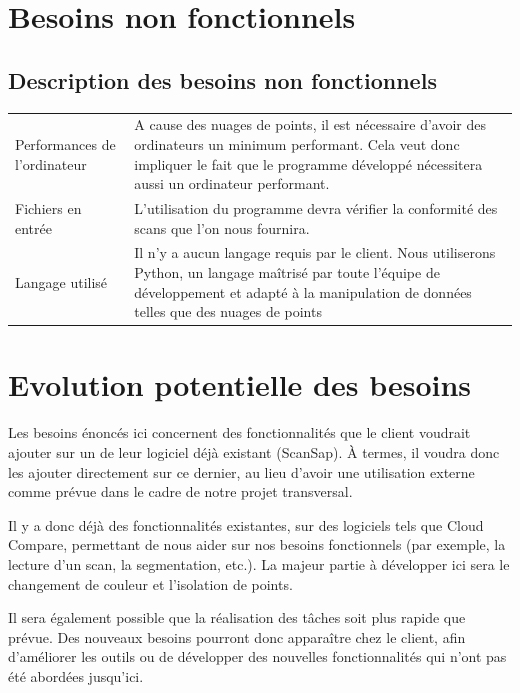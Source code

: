 \documentclass[12pt,titlepage,french]{article}
\begin{document}
\section{Besoins non fonctionnels}

\subsection*{Description des besoins non fonctionnels}

\noindent\begin{tabu} to \textwidth {X[c]X[c3]}\toprule
{}&\\\toprule
Performances de l'ordinateur
& A cause des nuages de points, il est nécessaire d'avoir des ordinateurs un minimum performant. Cela veut donc impliquer le fait que le programme développé nécessitera aussi un ordinateur performant.\\\midrule
Fichiers en entrée
& L'utilisation du programme devra vérifier la conformité des scans que l'on nous fournira.\\\midrule
Langage utilisé
& Il n'y a aucun langage requis par le client. Nous utiliserons Python, un langage maîtrisé par toute l'équipe de développement et adapté à la manipulation de données telles que des nuages de points\\\bottomrule
\end{tabu}

\section{Evolution potentielle des besoins}

Les besoins énoncés ici concernent des fonctionnalités que le client voudrait ajouter sur un de leur logiciel déjà existant (ScanSap). À termes, il voudra donc les ajouter directement sur ce dernier, au lieu d'avoir une utilisation externe comme prévue dans le cadre de notre projet transversal.

Il y a donc déjà des fonctionnalités existantes, sur des logiciels tels que Cloud Compare, permettant de nous aider sur nos besoins fonctionnels (par exemple, la lecture d'un scan, la segmentation, etc.). La majeur partie à développer ici sera le changement de couleur et l'isolation de points.

Il sera également possible que la réalisation des tâches soit plus rapide que prévue. Des nouveaux besoins pourront donc apparaître chez le client, afin d'améliorer les outils ou de développer des nouvelles fonctionnalités qui n'ont pas été abordées jusqu'ici.
\end{document}
